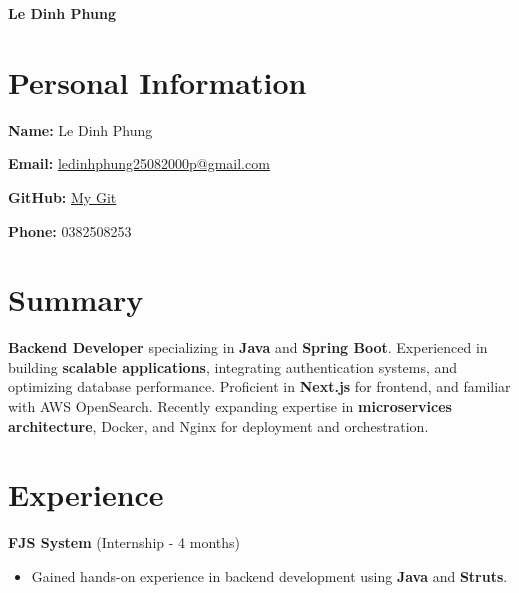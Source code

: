 \documentclass[11pt,a4paper]{article}
\begin{document}
\begin{center}
    {\Huge\bfseries\color{maincolor} Le Dinh Phung} \\[0.5em]
\end{center}

\vspace{1em}

\section{Personal Information}
\begin{adjustwidth}{2em}{}
\textbf{Name:} Le Dinh Phung

\textbf{Email:} \href{mailto:ledinhphung25082000p@gmail.com}{ledinhphung25082000p@gmail.com}

\textbf{GitHub:} \href{https://github.com/shegga9x}{My Git}

\textbf{Phone:} 0382508253
\end{adjustwidth}

\section{Summary}
\begin{adjustwidth}{2em}{}
\textbf{Backend Developer} specializing in \textbf{Java} and \textbf{Spring Boot}. Experienced in building \textbf{scalable applications}, integrating authentication systems, and optimizing database performance. Proficient in \textbf{Next.js} for frontend, and familiar with AWS OpenSearch. Recently expanding expertise in \textbf{microservices architecture}, Docker, and Nginx for deployment and orchestration.
\end{adjustwidth}

\section{Experience}
\begin{adjustwidth}{2em}{}
\textbf{FJS System} (Internship - 4 months)
\begin{itemize}[leftmargin=*]
    \item Gained hands-on experience in backend development using \textbf{Java} and \textbf{Struts}.
\end{itemize}
\end{adjustwidth}
\end{document}
